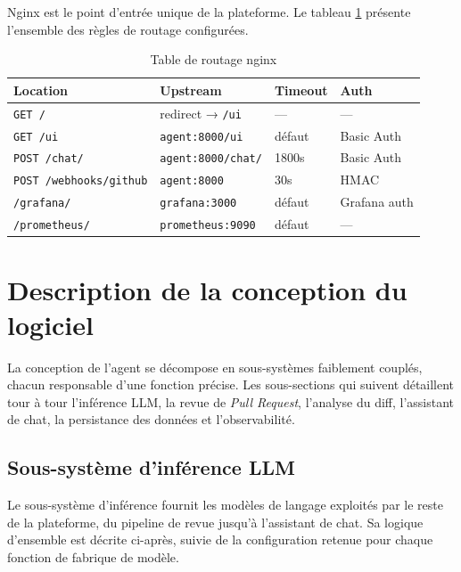         Nginx est le point d'entrée unique de la plateforme. Le tableau
        \ref{tab:nginx_routing} présente l'ensemble des règles de routage configurées.

        \begin{table}[H]
        \centering
        \begin{tabular}{|m{3.5cm}|m{3.5cm}|m{2cm}|m{2cm}|}
        \hline
        \textbf{Location} & \textbf{Upstream} & \textbf{Timeout} & \textbf{Auth} \\
        \hline
        \texttt{GET /} & redirect → \texttt{/ui} & — & — \\
        \hline
        \texttt{GET /ui} & \texttt{agent:8000/ui} & défaut & Basic Auth \\
        \hline
        \texttt{POST /chat/} & \texttt{agent:8000/chat/} & 1800s & Basic Auth \\
        \hline
        \texttt{POST /\allowbreak{}webhooks/\allowbreak{}github} & \texttt{agent:8000} & 30s & HMAC \\
        \hline
        \texttt{/grafana/} & \texttt{grafana:3000} & défaut & Grafana auth \\
        \hline
        \texttt{/\allowbreak{}prometheus/} & \texttt{prometheus:9090} & défaut & — \\
        \hline
        \end{tabular}
        \caption{Table de routage nginx}
        \label{tab:nginx_routing}
        \end{table}

\section{Description de la conception du logiciel}

    La conception de l'agent se décompose en sous-systèmes faiblement couplés, chacun
    responsable d'une fonction précise. Les sous-sections qui suivent détaillent tour à
    tour l'inférence LLM, la revue de \textit{Pull Request}, l'analyse du diff,
    l'assistant de chat, la persistance des données et l'observabilité.

    \subsection{Sous-système d'inférence LLM}

        Le sous-système d'inférence fournit les modèles de langage exploités par le reste
        de la plateforme, du pipeline de revue jusqu'à l'assistant de chat. Sa logique
        d'ensemble est décrite ci-après, suivie de la configuration retenue pour chaque
        fonction de fabrique de modèle.

